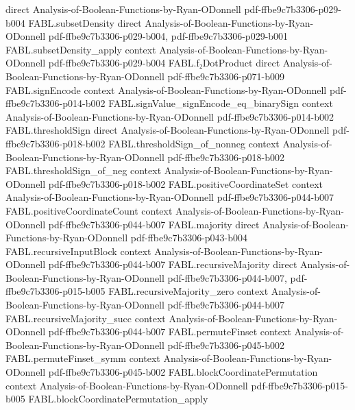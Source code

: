 \begin{theorem}
  {direct}
  {Analysis-of-Boolean-Functions-by-Ryan-ODonnell}
  {pdf-ffbe9c7b3306-p029-b004}
\proofstep
  {FABL.subsetDensity}
  {direct}
  {Analysis-of-Boolean-Functions-by-Ryan-ODonnell}
  {pdf-ffbe9c7b3306-p029-b004,
    pdf-ffbe9c7b3306-p029-b001}
\proofstep
  {FABL.subsetDensity_apply}
  {context}
  {Analysis-of-Boolean-Functions-by-Ryan-ODonnell}
  {pdf-ffbe9c7b3306-p029-b004}
\proofstep
  {FABL.f₂DotProduct}
  {direct}
  {Analysis-of-Boolean-Functions-by-Ryan-ODonnell}
  {pdf-ffbe9c7b3306-p071-b009}
\proofstep
  {FABL.signEncode}
  {context}
  {Analysis-of-Boolean-Functions-by-Ryan-ODonnell}
  {pdf-ffbe9c7b3306-p014-b002}
\proofstep
  {FABL.signValue_signEncode_eq_binarySign}
  {context}
  {Analysis-of-Boolean-Functions-by-Ryan-ODonnell}
  {pdf-ffbe9c7b3306-p014-b002}
\proofstep
  {FABL.thresholdSign}
  {direct}
  {Analysis-of-Boolean-Functions-by-Ryan-ODonnell}
  {pdf-ffbe9c7b3306-p018-b002}
\proofstep
  {FABL.thresholdSign_of_nonneg}
  {context}
  {Analysis-of-Boolean-Functions-by-Ryan-ODonnell}
  {pdf-ffbe9c7b3306-p018-b002}
\proofstep
  {FABL.thresholdSign_of_neg}
  {context}
  {Analysis-of-Boolean-Functions-by-Ryan-ODonnell}
  {pdf-ffbe9c7b3306-p018-b002}
\proofstep
  {FABL.positiveCoordinateSet}
  {context}
  {Analysis-of-Boolean-Functions-by-Ryan-ODonnell}
  {pdf-ffbe9c7b3306-p044-b007}
\proofstep
  {FABL.positiveCoordinateCount}
  {context}
  {Analysis-of-Boolean-Functions-by-Ryan-ODonnell}
  {pdf-ffbe9c7b3306-p044-b007}
\proofstep
  {FABL.majority}
  {direct}
  {Analysis-of-Boolean-Functions-by-Ryan-ODonnell}
  {pdf-ffbe9c7b3306-p043-b004}
\proofstep
  {FABL.recursiveInputBlock}
  {context}
  {Analysis-of-Boolean-Functions-by-Ryan-ODonnell}
  {pdf-ffbe9c7b3306-p044-b007}
\proofstep
  {FABL.recursiveMajority}
  {direct}
  {Analysis-of-Boolean-Functions-by-Ryan-ODonnell}
  {pdf-ffbe9c7b3306-p044-b007,
    pdf-ffbe9c7b3306-p015-b005}
\proofstep
  {FABL.recursiveMajority_zero}
  {context}
  {Analysis-of-Boolean-Functions-by-Ryan-ODonnell}
  {pdf-ffbe9c7b3306-p044-b007}
\proofstep
  {FABL.recursiveMajority_succ}
  {context}
  {Analysis-of-Boolean-Functions-by-Ryan-ODonnell}
  {pdf-ffbe9c7b3306-p044-b007}
\proofstep
  {FABL.permuteFinset}
  {context}
  {Analysis-of-Boolean-Functions-by-Ryan-ODonnell}
  {pdf-ffbe9c7b3306-p045-b002}
\proofstep
  {FABL.permuteFinset_symm}
  {context}
  {Analysis-of-Boolean-Functions-by-Ryan-ODonnell}
  {pdf-ffbe9c7b3306-p045-b002}
\proofstep
  {FABL.blockCoordinatePermutation}
  {context}
  {Analysis-of-Boolean-Functions-by-Ryan-ODonnell}
  {pdf-ffbe9c7b3306-p015-b005}
\proofstep
  {FABL.blockCoordinatePermutation_apply}

\end{theorem}

